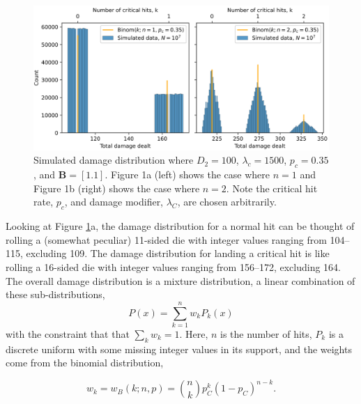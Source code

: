 \documentclass{article}
\begin{document}
        \begin{figure}[H]
            \centering
            \includegraphics[width=0.95\linewidth]{img/binom-dmg-dist.PNG}
            \caption{Simulated damage distribution where $D_2 = 100$, $\lambda_c = 1500$, $p_c = 0.35$, and $\textbf{B} = [1.1]$. Figure 1a (left) shows the case where $n=1$ and Figure 1b (right) shows the case where $n=2$. Note the critical hit rate, $p_c$, and damage modifier, $\lambda_C$, are chosen arbitrarily.}\label{fig:CH-dmg-dist}
        \end{figure}

        Looking at Figure \ref{fig:CH-dmg-dist}a, the damage distribution for a normal hit can be thought of  rolling a (somewhat peculiar)  11-sided die with integer values ranging from 104--115, excluding 109. The damage distribution for landing a critical hit is like rolling a 16-sided die with integer values ranging from 156--172, excluding 164. The overall damage distribution is a mixture distribution, a linear combination of these sub-distributions,
        \begin{equation}
            P(x) = \sum_{k=1}^n w_k P_k(x)
        \end{equation}
        with the constraint that that $\sum_k w_k = 1$. Here, $n$ is the number of hits, $P_k$ is a discrete uniform with some missing integer values in its support, and the weights come from the binomial distribution, 

        \begin{equation}
            w_k = w_B(k;n, p) = \binom{n}{k}p_C^k (1-p_C)^{n-k}.
        \end{equation}
        
        
\end{document}

